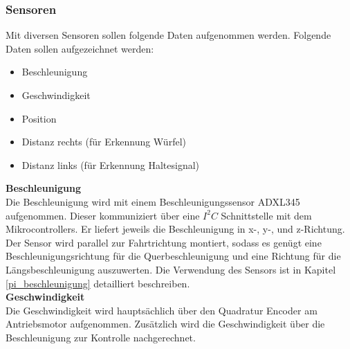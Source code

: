\documentclass[../../main.tex]{subfiles}
\begin{document}
    \subsubsection{Sensoren} \label{et_sensoren}
    Mit diversen Sensoren sollen folgende Daten aufgenommen werden. Folgende Daten sollen aufgezeichnet werden:
    \begin{itemize}
        \item Beschleunigung
        \item Geschwindigkeit
        \item Position
        \item Distanz rechts (für Erkennung Würfel)
        \item Distanz links (für Erkennung Haltesignal)
    \end{itemize}
    \pagebreak
    \textbf{Beschleunigung}\\
    Die Beschleunigung wird mit einem Beschleunigungssensor ADXL345 aufgenommen. Dieser kommuniziert über eine $I^2C$ Schnittstelle mit dem Mikrocontrollers. Er liefert jeweils die Beschleunigung in x-, y-, und z-Richtung. Der Sensor wird parallel zur Fahrtrichtung montiert, sodass es genügt eine Beschleunigungsrichtung für die Querbeschleunigung und eine Richtung für die Längsbeschleunigung auszuwerten. Die Verwendung des Sensors ist in Kapitel \ref{pi_beschleunigung} detailliert beschreiben.\\

    \textbf{Geschwindigkeit}\\
    Die Geschwindigkeit wird hauptsächlich über den Quadratur Encoder am Antriebsmotor aufgenommen. Zusätzlich wird die
    Geschwindigkeit über die Beschleunigung zur Kontrolle nachgerechnet.
\end{document}
